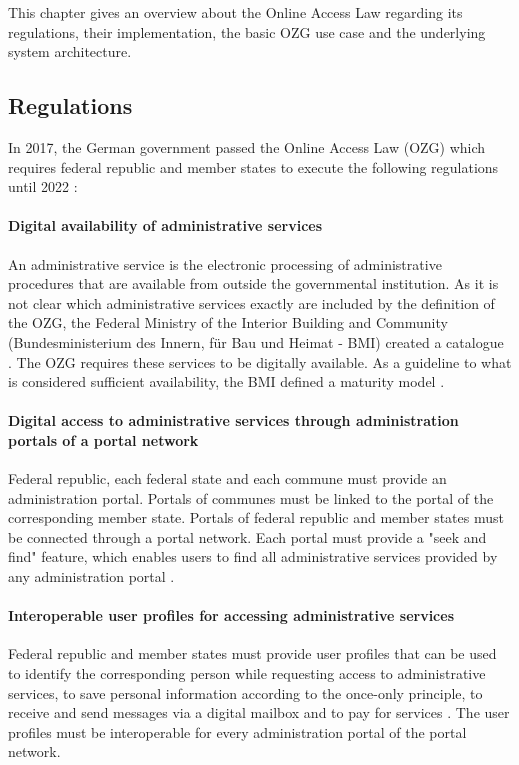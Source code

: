 This chapter gives an overview about the Online Access Law regarding its regulations, their implementation, the basic OZG use case and the underlying system architecture.

\subsection{Regulations}

In 2017, the German government passed the Online Access Law (OZG) which requires federal republic and member states to execute the following regulations until 2022 \cite{BMI:OZG_Wortlaut}:

\paragraph{Digital availability of administrative services} An administrative service is the electronic processing of administrative procedures that are available from outside the governmental institution.  As it is not clear which administrative services exactly are included by the definition of the OZG, the Federal Ministry of the Interior Building and Community (Bundesministerium des Innern, für Bau und Heimat - BMI) created a catalogue \cite{BMI:Verwaltungsleistungen}. The OZG requires these services to be digitally available. As a guideline to what is considered sufficient availability, the BMI defined a maturity model \cite{BMI:Digitale_Services}.

\paragraph{Digital access to administrative services through administration portals of a portal network} Federal republic, each federal state and each commune must provide an administration portal. Portals of communes must be linked to the portal of the corresponding member state. Portals of federal republic and member states must be connected through a portal network. \cite{BMI:Portalverbund} Each portal must provide a "seek and find" feature, which enables users to find all administrative services provided by any administration portal \cite{Cotar:Drucksache_19/19089}. 

\paragraph{Interoperable user profiles for accessing administrative services} Federal republic and member states must provide user profiles that can be used to identify the corresponding person while requesting access to administrative services, to save personal information according to the once-only principle, to receive and send messages via a digital mailbox and to pay for services \cite{Cotar:Drucksache_19/19089}. The user profiles must be interoperable for every administration portal of the portal network.


